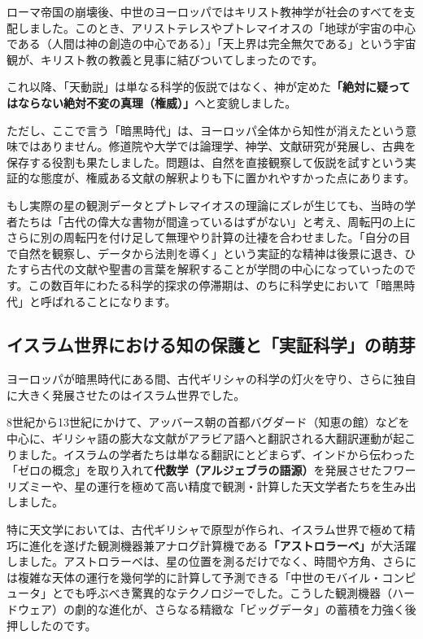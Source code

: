 ローマ帝国の崩壊後、中世のヨーロッパではキリスト教神学が社会のすべてを支配しました。このとき、アリストテレスやプトレマイオスの「地球が宇宙の中心である（人間は神の創造の中心である）」「天上界は完全無欠である」という宇宙観が、キリスト教の教義と見事に結びついてしまったのです。

これ以降、「天動説」は単なる科学的仮説ではなく、神が定めた\textbf{「絶対に疑ってはならない絶対不変の真理（権威）」}へと変貌しました。

ただし、ここで言う「暗黒時代」は、ヨーロッパ全体から知性が消えたという意味ではありません。修道院や大学では論理学、神学、文献研究が発展し、古典を保存する役割も果たしました。問題は、自然を直接観察して仮説を試すという実証的な態度が、権威ある文献の解釈よりも下に置かれやすかった点にあります。

もし実際の星の観測データとプトレマイオスの理論にズレが生じても、当時の学者たちは「古代の偉大な書物が間違っているはずがない」と考え、周転円の上にさらに別の周転円を付け足して無理やり計算の辻褄を合わせました。「自分の目で自然を観察し、データから法則を導く」という実証的な精神は後景に退き、ひたすら古代の文献や聖書の言葉を解釈することが学問の中心になっていったのです。この数百年にわたる科学的探求の停滞期は、のちに科学史において「暗黒時代」と呼ばれることになります。

\subsection{イスラム世界における知の保護と「実証科学」の萌芽}

ヨーロッパが暗黒時代にある間、古代ギリシャの科学の灯火を守り、さらに独自に大きく発展させたのはイスラム世界でした。

8世紀から13世紀にかけて、アッバース朝の首都バグダード（知恵の館）などを中心に、ギリシャ語の膨大な文献がアラビア語へと翻訳される大翻訳運動が起こりました。イスラムの学者たちは単なる翻訳にとどまらず、インドから伝わった「ゼロの概念」を取り入れて\textbf{代数学（アルジェブラの語源）}を発展させたフワーリズミーや、星の運行を極めて高い精度で観測・計算した天文学者たちを生み出しました。

特に天文学においては、古代ギリシャで原型が作られ、イスラム世界で極めて精巧に進化を遂げた観測機器兼アナログ計算機である\textbf{「アストロラーベ」}が大活躍しました。アストロラーベは、星の位置を測るだけでなく、時間や方角、さらには複雑な天体の運行を幾何学的に計算して予測できる「中世のモバイル・コンピュータ」とでも呼ぶべき驚異的なテクノロジーでした。こうした観測機器（ハードウェア）の劇的な進化が、さらなる精緻な「ビッグデータ」の蓄積を力強く後押ししたのです。

